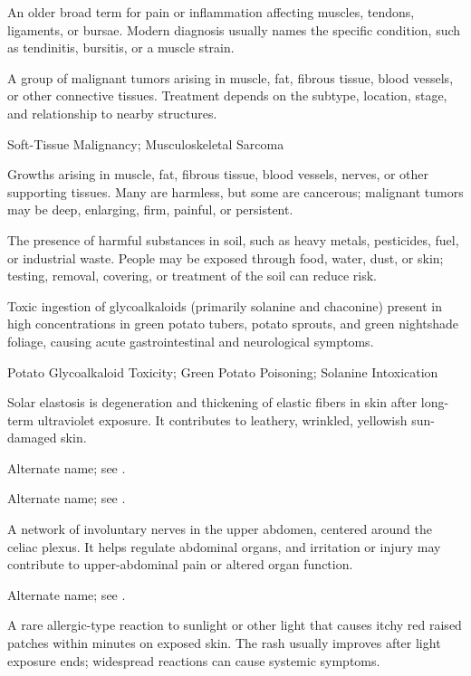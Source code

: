  An older broad term for pain or inflammation affecting muscles, tendons, ligaments, or bursae. Modern diagnosis usually names the specific condition, such as tendinitis, bursitis, or a muscle strain.

 A group of malignant tumors arising in muscle, fat, fibrous tissue, blood vessels, or
other connective tissues. Treatment depends on the subtype, location, stage, and relationship to nearby structures.

\synonyms
Soft-Tissue Malignancy; Musculoskeletal Sarcoma

 Growths arising in muscle, fat, fibrous tissue, blood vessels, nerves, or other supporting tissues. Many are harmless, but some are cancerous; malignant tumors may be deep, enlarging, firm, painful, or persistent.

 The presence of harmful substances in soil, such as heavy metals, pesticides, fuel, or industrial waste. People may be exposed through food, water, dust, or skin; testing, removal, covering, or treatment of the soil can reduce risk.

 Toxic ingestion of glycoalkaloids (primarily solanine and chaconine) present in high concentrations in green potato tubers, potato sprouts, and green nightshade foliage, causing acute gastrointestinal and neurological symptoms.

\synonyms
Potato Glycoalkaloid Toxicity; Green Potato Poisoning; Solanine Intoxication

 Solar elastosis is degeneration and thickening of elastic fibers in skin after long-term ultraviolet exposure. It contributes to leathery, wrinkled, yellowish sun-damaged skin.

 Alternate name; see .

 Alternate name; see .

 A network of involuntary nerves in the upper abdomen, centered around the celiac plexus. It helps regulate abdominal organs, and irritation or injury may contribute to upper-abdominal pain or altered organ function.

 Alternate name; see .

 A rare allergic-type reaction to sunlight or other light that causes itchy red raised patches within minutes on exposed skin. The rash usually improves after light exposure ends; widespread reactions can cause systemic symptoms.

